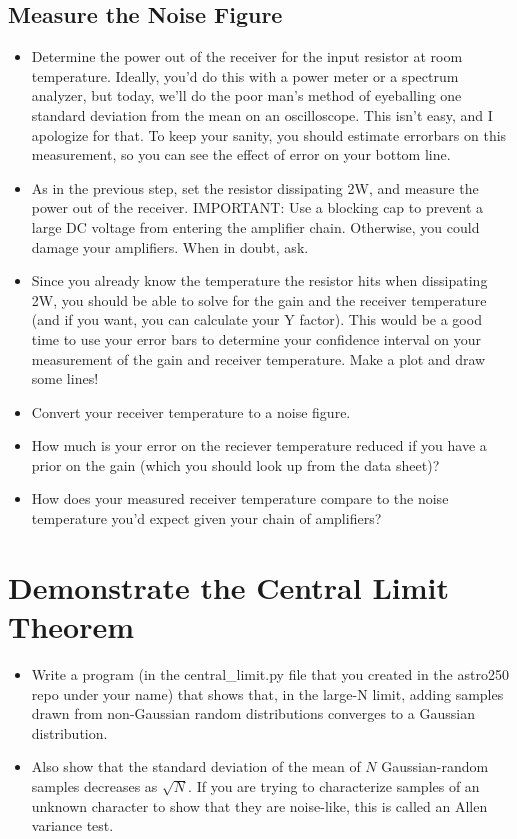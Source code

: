 \documentclass[11pt]{article}
\begin{document}
\subsection*{Measure the Noise Figure}
\begin{itemize}
\item Determine the power out of the receiver for the input resistor at room temperature.  Ideally, you'd do this
with a power meter or a spectrum analyzer, but today, we'll do the poor man's method of eyeballing one
standard deviation from the mean on an oscilloscope.  This isn't easy, and I apologize for that.  To keep your
sanity, you should estimate errorbars on this measurement, so you can see the effect of error on
your bottom line.
\item As in the previous step, set the resistor dissipating 2W, and measure the power out of the receiver.
IMPORTANT: Use a blocking cap to prevent a large DC voltage from entering the amplifier chain.  Otherwise, you
could damage your amplifiers.  When in doubt, ask.
\item Since you already know the temperature the resistor hits when dissipating 2W, you should be able to
solve for the gain and the receiver temperature (and if you want, you can calculate your Y factor).  This
would be a good time to use your error bars to determine your confidence interval on your measurement
of the gain and receiver temperature.  Make a plot and draw some lines!
\item Convert your receiver temperature to a noise figure.
\item How much is your error on the reciever temperature reduced if you have a prior on the gain (which
you should look up from the data sheet)?
\item How does your measured receiver temperature compare to the noise temperature you'd expect given
your chain of amplifiers? 
\end{itemize}

\section{Demonstrate the Central Limit Theorem}
\begin{itemize}
\item Write a program (in the central\_limit.py file that you created in the astro250 repo under your name)
that shows that, in the large-N limit, adding samples drawn from non-Gaussian random
distributions converges to a Gaussian distribution.
\item Also show that the standard deviation of the mean of $N$ Gaussian-random samples decreases as $\sqrt{N}$.
If you are trying to characterize samples of an unknown character to show that they are noise-like, this
is called an Allen variance test.
\end{itemize}
\end{document}
